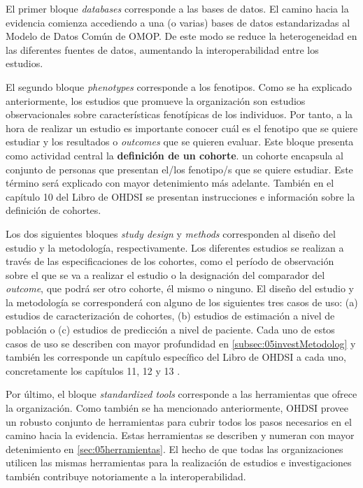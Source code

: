 El primer bloque \textit{databases} corresponde a las bases de datos. El camino hacia la evidencia comienza accediendo a una (o varias) bases de datos estandarizadas al Modelo de Datos Común de OMOP. De este modo se reduce la heterogeneidad en las diferentes fuentes de datos, aumentando la interoperabilidad entre los estudios. 

El segundo bloque \textit{phenotypes} corresponde a los fenotipos. Como se ha explicado anteriormente, los estudios que promueve la organización son estudios observacionales sobre características fenotípicas de los individuos. Por tanto, a la hora de realizar un estudio es importante conocer cuál es el fenotipo que se quiere estudiar y los resultados o \textit{outcomes} que se quieren evaluar. Este bloque presenta como actividad central la \textbf{definición de un cohorte}. un cohorte encapsula al conjunto de personas que presentan el/los fenotipo/s que se quiere estudiar. Este término será explicado con mayor detenimiento más adelante. También en el capítulo 10 del Libro de OHDSI \cite{OHDSIbook} se presentan instrucciones e información sobre la definición de cohortes.

Los dos siguientes bloques \textit{study design} y \textit{methods} corresponden al diseño del estudio y la metodología, respectivamente. Los diferentes estudios se realizan a través de las especificaciones de los cohortes, como el período de observación sobre el que se va a realizar el estudio o la designación del comparador del \textit{outcome}, que podrá ser otro cohorte, él mismo o ninguno. El diseño del estudio y la metodología se corresponderá con alguno de los siguientes tres casos de uso: (a) estudios de caracterización de cohortes, (b) estudios de estimación a nivel de población o (c) estudios de predicción a nivel de paciente. Cada uno de estos casos de uso se describen con mayor profundidad en \ref{subsec:05investMetodolog} y también les corresponde un capítulo específico del Libro de OHDSI a cada uno, concretamente los capítulos 11, 12 y 13 \cite{OHDSIbook}.

Por último, el bloque \textit{standardized tools} corresponde a las herramientas que ofrece la organización. Como también se ha mencionado anteriormente, OHDSI provee un robusto conjunto de herramientas para cubrir todos los pasos necesarios en el camino hacia la evidencia. Estas herramientas se describen y numeran con mayor detenimiento en \ref{sec:05herramientas}. El hecho de que todas las organizaciones utilicen las mismas herramientas para la realización de estudios e investigaciones también contribuye notoriamente a la interoperabilidad. 

